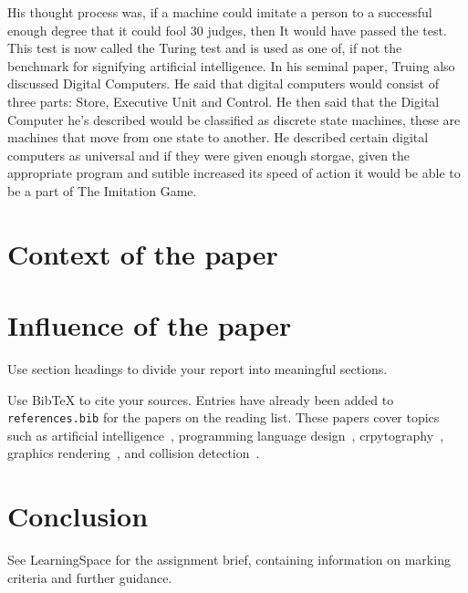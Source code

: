 \documentclass{article}
\begin{document}
His thought process was, if a machine could imitate a person to a successful enough degree that it could fool 30%
judges, then It would have passed the test. This test is now called the Turing test and is used as one of, if not the benchmark for signifying artificial intelligence. In his seminal paper, Truing also discussed Digital Computers. He 
said that digital computers would consist of three parts: Store, Executive Unit and Control. He then said that the 
Digital Computer he’s described would be classified as discrete state machines, these are machines that move from one 
state to another. He described certain digital computers as universal and if they were given enough storgae, given the appropriate program and sutible increased its speed of action it would be able to be a part of The Imitation Game.

\section{Context of the paper}

\section{Influence of the paper}

Use section headings to divide your report into meaningful sections.

Use BibTeX to cite your sources. Entries have already been added to \texttt{references.bib} for the papers on the reading list.
These papers cover topics such as artificial intelligence~\cite{turing1950_intelligence, knuth1975_alphabeta}, programming language design~\cite{dijkstra1968_goto}, crpytography~\cite{rivest1978_rsa}, graphics rendering~\cite{phong1975_illumination}, and collision detection~\cite{gilbert1988_gjk}.

\section{Conclusion}

See LearningSpace for the assignment brief, containing information on marking criteria and further guidance.











\end{document}
